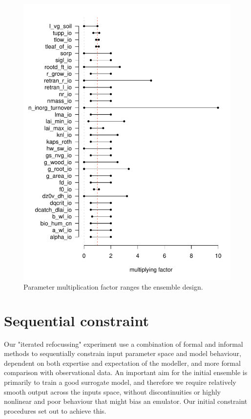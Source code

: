 \documentclass[gmd, manuscript]{copernicus}
\begin{document}
\begin{figure}[t]
\includegraphics[width=12cm]{./figs/lhs_range.pdf}
\caption{Parameter multiplication factor ranges the ensemble design.}
\label{fig:lhs_range}
\end{figure}

\section{Sequential constraint}\label{sec:sequential_constraint}

Our "iterated refocussing" experiment use a combination of formal and informal methods to sequentially constrain input parameter space and model behaviour, dependent on both expertise and expectation of the modeller, and more formal comparison with observational data. An important aim for the initial ensemble is primarily to train a good surrogate model, and therefore we require relatively smooth output across the inputs space, without discontinuities or highly nonlinear and poor behaviour that might bias an emulator. Our initial constraint procedures set out to achieve this.
\end{document}
